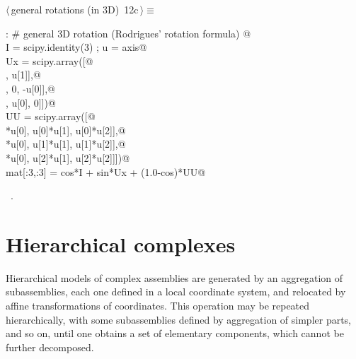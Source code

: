 \documentclass[11pt,oneside]{article}	%
\begin{document}
\begin{flushleft} \small \label{scrap27}
\protect{}$\langle\,$general rotations (in 3D)\nobreak\ {\footnotesize 12c}$\,\rangle\equiv$
\vspace{-1ex}
\begin{list}{}{} \item
\mbox{}\verb@else:    # general 3D rotation (Rodrigues' rotation formula)   @\\
\mbox{}\verb@   I = scipy.identity(3) ; u = axis@\\
\mbox{}\verb@   Ux = scipy.array([@\\
\mbox{}\verb@      [0,      -u[2],    u[1]],@\\
\mbox{}\verb@      [u[2],      0,    -u[0]],@\\
\mbox{}\verb@      [-u[1],   u[0],      0]])@\\
\mbox{}\verb@   UU = scipy.array([@\\
\mbox{}\verb@      [u[0]*u[0], u[0]*u[1],  u[0]*u[2]],@\\
\mbox{}\verb@      [u[1]*u[0], u[1]*u[1],  u[1]*u[2]],@\\
\mbox{}\verb@      [u[2]*u[0], u[2]*u[1],  u[2]*u[2]]])@\\
\mbox{}\verb@   mat[:3,:3] = cos*I + sin*Ux + (1.0-cos)*UU@\\
\mbox{}\verb@@{\NWsep}
\end{list}
\vspace{-1ex}
\footnotesize\addtolength{\baselineskip}{-1ex}
\begin{list}{}{\setlength{\itemsep}{-\parsep}\setlength{\itemindent}{-\leftmargin}}
\item \NWtxtMacroRefIn\ .
\end{list}
\end{flushleft}
\section{Hierarchical complexes}
Hierarchical models of complex assemblies are generated by an aggregation
of subassemblies, each one defined in a local coordinate system, and
relocated by affine transformations of coordinates.  This operation
may be repeated hierarchically, with some subassemblies defined by
aggregation of simpler parts, and so on, until one obtains a set of
elementary components, which cannot be further decomposed.
\end{document}
